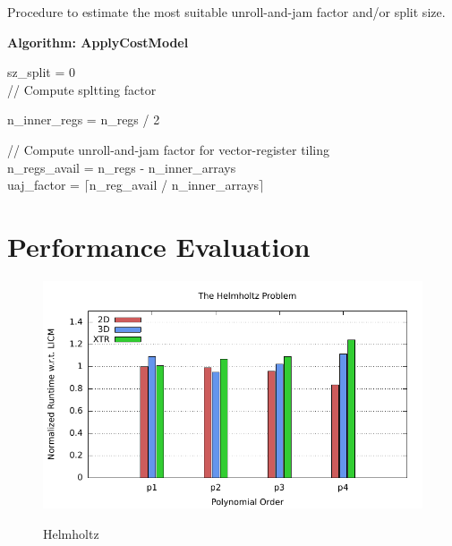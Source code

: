 \documentclass[conference]{IEEEtran}
\begin{document}
\begin{algorithm}[t]
\caption{Procedure to estimate the most suitable unroll-and-jam factor and/or split size.}
\label{algo:applyCostModel}
  \textbf{Algorithm: ApplyCostModel}\\


sz\_split = 0 \\
// Compute spltting factor \\

n\_inner\_regs = n\_regs / 2 \\

// Compute unroll-and-jam factor for vector-register tiling \\
n\_regs\_avail = n\_regs - n\_inner\_arrays \\
uaj\_factor = $\lceil$n\_reg\_avail / n\_inner\_arrays$\rceil$ \\
\end{algorithm}

\clearpage

\section{Performance Evaluation}
\label{sec:perf-results}
\begin{figure}[h]
\centerline{\includegraphics[scale=0.7]{Pictures/helmholtz-normalized.pdf}
\label{fig_first_case}}
\caption{Helmholtz}
\end{figure}
\end{document}
